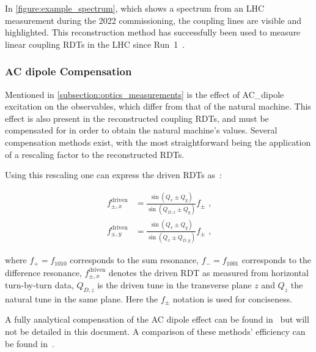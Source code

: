 In \cref{figure:example_spectrum}, which shows a spectrum from an LHC measurement during the \num{2022} commissioning, the coupling lines are visible and highlighted.
This reconstruction method has successfully been used to measure linear coupling RDTs in the LHC since Run~\num{1}~\cite{PRAB:Benedikt:Driving_Term_Experiments_CERN,IPAC:Persson:Automatic_Coupling_Correction_LHC_Injection_Oscillations,IPAC:Miyamoto:Measurement_Coupling_RDTs_LHC_AC_Dipole}.

\subsubsection*{AC dipole Compensation}

Mentioned in \cref{subsection:optics_measurements} is the effect of \gls{AC_dipole} excitation on the observables, which differ from that of the natural machine.
This effect is also present in the reconstructed coupling \glspl{RDT}, and must be compensated for in order to obtain the natural machine's values.
Several compensation methods exist, with the most straightforward being the application of a rescaling factor to the reconstructed \glspl{RDT}.

Using this rescaling one can express the driven \glspl{RDT} as~\cite{IPAC:Wegscheider:Forced_Coupling_Resonance_Driving_Terms}:

\begin{equation}
  \begin{aligned}
    f_{\pm, x}^{\mathrm{driven}} &= \frac{\sin \left( Q_x \pm Q_y \right)}{\sin \left( Q_{D,x} \pm Q_y \right)} f_{\pm} \text{ ,} \\
    f_{\pm, y}^{\mathrm{driven}} &= \frac{\sin \left( Q_x \pm Q_y \right)}{\sin \left( Q_x \pm Q_{D,y} \right)} f_{\pm} \text{ ,}
  \end{aligned}
  \label{equation:rescaling_coupling_rdts}
\end{equation}
\vspace{1pt}

\noindent
where \(f_{+} = f_{1010}\) corresponds to the sum resonance, \(f_{-} = f_{1001}\) corresponds to the difference resonance, \(f_{\pm, x}^{\mathrm{driven}}\) denotes the driven \gls{RDT} as measured from horizontal turn-by-turn data, \(Q_{D, z}\) is the driven tune in the transverse plane \(z\) and \(Q_z\) the natural tune in the same plane.
Here the \(f_{\pm}\) notation is used for conciseness.

A fully analytical compensation of the AC dipole effect can be found in~\cite{REPORT:Miyamoto:Measurement_Coupling_Resonance_Driving_Terms,IPAC:Miyamoto:Measurement_Coupling_RDTs_LHC_AC_Dipole} but will not be detailed in this document.
A comparison of these methods' efficiency can be found in~\cite{IPAC:Wegscheider:NBPM_Momentum_Reconstruction_for_Linear_Coupling_RDTs}.

